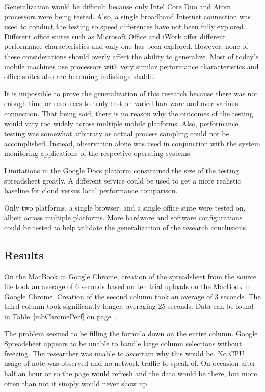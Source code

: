 Generalization would be difficult because only Intel Core Duo and Atom
processors were being tested.  Also, a single broadband Internet connection was
used to conduct the testing so speed differences have not been fully explored.
Different office suites such as Microsoft Office and iWork offer different
performance characteristics and only one has been explored.  However, none of
these considerations should overly affect the ability to generalize.  Most of
today's mobile machines use processors with very similar performance
characteristics and office suites also are becoming indistinguishable.

It is impossible to prove the generalization of this research because there was
not enough time or resources to truly test on varied hardware and over various
connection.  That being said, there is no reason why the outcomes of the testing
would vary too widely across multiple mobile platforms.  Also, performance
testing was somewhat arbitrary as actual process sampling could not be
accomplished.  Instead, observation alone was used in conjunction with the
system monitoring applications of the respective operating systems.

Limitations in the Google Docs platform constrained the size of the testing
spreadsheet greatly.  A different service could be used to get a more realistic
baseline for cloud versus local performance comparison.

Only two platforms, a single browser, and a single office suite were tested on,
albeit across multiple platforms.  More hardware and software configurations
could be tested to help validate the generalization of the research conclusions.

\subsection{Results}

On the MacBook in Google Chrome, creation of the spreadsheet from the source
file took an average of 6 seconds based on ten trial uploads on the MacBook in
Google Chrome. Creation of the second column took an average of 3 seconds. The
third column took significantly longer, averaging 25 seconds. Data can be found
in Table~\ref{mbChromePerf} on page~\pageref{mbChromePerf}.



The problem seemed to be filling the formula down on the entire column.  Google
Spreadsheet appears to be unable to handle large column selections without
freezing.  The researcher was unable to ascertain why this would be.  No CPU
usage of note was observed and no network traffic to speak of.  On occasion
after half an hour or so the page would refresh and the data would be there, but
more often than not it simply would never show up.

